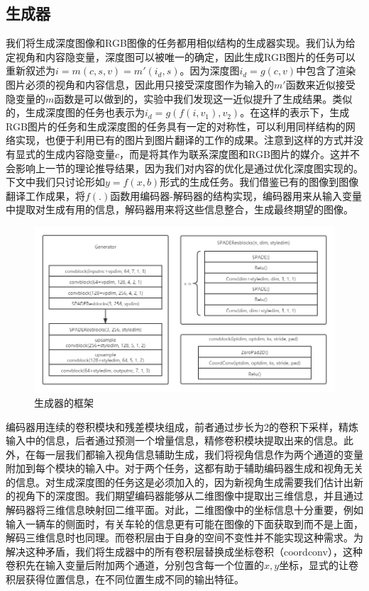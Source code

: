 \documentclass[UTF8,openany,AutoFakeBold,AutoFakeSlant,cs4size]{ctexbook}
\begin{document}
\subsection{生成器}

我们将生成深度图像和RGB图像的任务都用相似结构的生成器实现。我们认为给定视角和内容隐变量，深度图可以被唯一的确定，因此生成RGB图片的任务可以重新叙述为$i = m(c, s, v) = m'(i_d, s)$。因为深度图$i_d = g(c, v)$中包含了渲染图片必须的视角和内容信息，因此用只接受深度图作为输入的$m'$函数来近似接受隐变量的$m$函数是可以做到的，实验中我们发现这一近似提升了生成结果。类似的，生成深度图的任务也表示为$i_{d} = g(f(i, v_1), v_2)$。在这样的表示下，生成RGB图片的任务和生成深度图的任务具有一定的对称性，可以利用同样结构的网络实现，也便于利用已有的图片到图片翻译的工作的成果。注意到这样的方式并没有显式的生成内容隐变量$c$，而是将其作为联系深度图和RGB图片的媒介。这并不会影响上一节的理论推导结果，因为我们对内容的优化是通过优化深度图实现的。下文中我们只讨论形如$y = f(x, b)$形式的生成任务。我们借鉴已有的图像到图像翻译工作成果，将$f(.)$函数用编码器-解码器的结构实现，编码器用来从输入变量中提取对生成有用的信息，解码器用来将这些信息整合，生成最终期望的图像。

\begin{figure}
\centering
\includegraphics[width=15cm]{./images/generator.png}
\caption{生成器的框架}
\label{model_generator}
\end{figure}


编码器用连续的卷积模块和残差模块组成，前者通过步长为2的卷积下采样，精炼输入中的信息，后者通过预测一个增量信息，精修卷积模块提取出来的信息。此外，在每一层我们都输入视角信息辅助生成，我们将视角信息作为两个通道的变量附加到每个模块的输入中。对于两个任务，这都有助于辅助编码器生成和视角无关的信息。对生成深度图的任务这是必须加入的，因为新视角生成需要我们估计出新的视角下的深度图。我们期望编码器能够从二维图像中提取出三维信息，并且通过解码器将三维信息映射回二维平面。对此，二维图像中的坐标信息十分重要，例如输入一辆车的侧面时，有关车轮的信息更有可能在图像的下面获取到而不是上面，解码三维信息时也同理。而卷积层由于自身的空间不变性并不能实现这种需求。为解决这种矛盾，我们将生成器中的所有卷积层替换成坐标卷积（coordconv），这种卷积先在输入变量后附加两个通道，分别包含每一个位置的$x,y$坐标，显式的让卷积层获得位置信息，在不同位置生成不同的输出特征。
\end{document}
